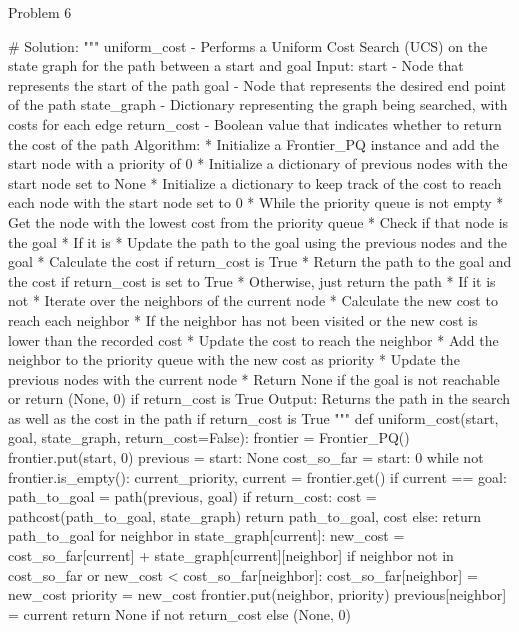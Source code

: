 \begin{problem}{Problem 6}
\begin{highlight}[Solution]
\begin{code}[Python]
    
    # Solution:
    """ uniform_cost - Performs a Uniform Cost Search (UCS) on the state graph for the path between a start and goal
        Input:
            start - Node that represents the start of the path
            goal - Node that represents the desired end point of the path
            state_graph - Dictionary representing the graph being searched, with costs for each edge
            return_cost - Boolean value that indicates whether to return the cost of the path
        Algorithm:
            * Initialize a Frontier_PQ instance and add the start node with a priority of 0
            * Initialize a dictionary of previous nodes with the start node set to None
            * Initialize a dictionary to keep track of the cost to reach each node with the start node set to 0
            * While the priority queue is not empty
                * Get the node with the lowest cost from the priority queue
                * Check if that node is the goal
                * If it is
                    * Update the path to the goal using the previous nodes and the goal
                    * Calculate the cost if return_cost is True
                    * Return the path to the goal and the cost if return_cost is set to True
                    * Otherwise, just return the path
                * If it is not
                    * Iterate over the neighbors of the current node
                    * Calculate the new cost to reach each neighbor
                    * If the neighbor has not been visited or the new cost is lower than the recorded cost
                        * Update the cost to reach the neighbor
                        * Add the neighbor to the priority queue with the new cost as priority
                        * Update the previous nodes with the current node
            * Return None if the goal is not reachable or return (None, 0) if return_cost is True
        Output:
            Returns the path in the search as well as the cost in the path if return_cost is True
    """
    def uniform_cost(start, goal, state_graph, return_cost=False):
        frontier = Frontier_PQ()
        frontier.put(start, 0)
        previous = {start: None}
        cost_so_far = {start: 0}
        while not frontier.is_empty():
            current_priority, current = frontier.get()
            if current == goal:
                path_to_goal = path(previous, goal)
                if return_cost:
                    cost = pathcost(path_to_goal, state_graph)
                    return path_to_goal, cost
                else:
                    return path_to_goal
            for neighbor in state_graph[current]:
                new_cost = cost_so_far[current] + state_graph[current][neighbor]
                if neighbor not in cost_so_far or new_cost < cost_so_far[neighbor]:
                    cost_so_far[neighbor] = new_cost
                    priority = new_cost
                    frontier.put(neighbor, priority)
                    previous[neighbor] = current
        return None if not return_cost else (None, 0)
    \end{code}
    \end{highlight}
\end{problem}

